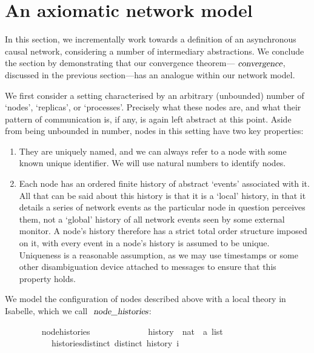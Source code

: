 \documentclass[acmlarge,review,anonymous]{acmart}\settopmatter{printfolios=true}
\begin{document}

\section{An axiomatic network model}
\label{sect.network}

In this section, we incrementally work towards a definition of an asynchronous causal network, considering a number of intermediary abstractions.
We conclude the section by demonstrating that our convergence theorem---$\isa{convergence}$, discussed in the previous section---has an analogue within our network model.

We first consider a setting characterised by an arbitrary (unbounded) number of `nodes', `replicas', or `processes'.
Precisely what these nodes are, and what their pattern of communication is, if any, is again left abstract at this point.
Aside from being unbounded in number, nodes in this setting have two key properties:
\begin{enumerate}
\item
They are uniquely named, and we can always refer to a node with some known unique identifier.
We will use natural numbers to identify nodes.
\item
Each node has an ordered finite history of abstract `events' associated with it.
All that can be said about this history is that it is a `local' history, in that it details a series of network events as the particular node in question perceives them, not a `global' history of all network events seen by some external monitor.
A node's history therefore has a strict total order structure imposed on it, with every event in a node's history is assumed to be unique.
Uniqueness is a reasonable assumption, as we may use timestamps or some other disambiguation device attached to messages to ensure that this property holds.
\end{enumerate}
We model the configuration of nodes described above with a local theory in Isabelle, which we call $\isa{node{\isacharunderscore}histories}$:
\\
\begin{isabellebody}
\ \ \ \ \ \ \ \  node{\isacharunderscore}histories\ {\isacharequal}\ \isanewline
\ \ \ \ \ \ \ \ \ \ \ history\ {\isacharcolon}{\isacharcolon}\ {\isachardoublequoteopen}nat\ {\isasymRightarrow}\ {\isacharprime}a\ list{\isachardoublequoteclose}\isanewline
\ \ \ \ \ \ \ \ \ \ \ histories{\isacharunderscore}distinct{\isacharcolon}\ {\isachardoublequoteopen}distinct\ {\isacharparenleft}history\ i{\isacharparenright}{\isachardoublequoteclose}
\end{isabellebody}
\end{document}
